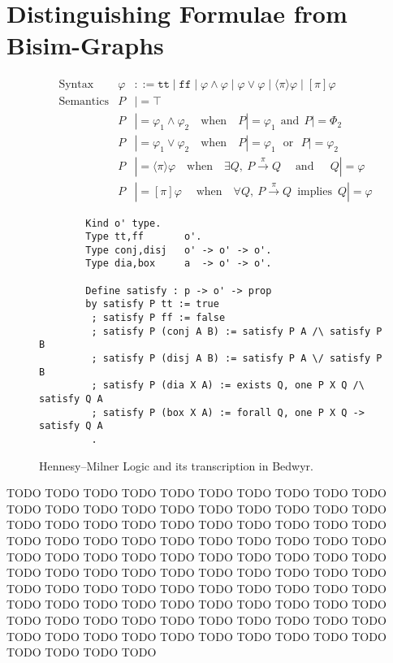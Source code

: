 \documentclass{llncs}
\begin{document}
\section{Distinguishing Formulae from Bisim-Graphs}\label{sec:ccsdf}

\begin{figure}
\begin{align*}
&\text{Syntax} &
\varphi & ::= \texttt{tt} \mid \texttt{ff}
    \mid \varphi \land \varphi \mid \varphi \lor \varphi
    \mid \langle\pi\rangle \varphi \mid [\pi] \varphi
\\
&\text{Semantics} &
  P & |= \top \\&&
  P & |= \varphi_1 \land \varphi_2 \quad\text{when}\quad P |= \varphi_1 ~~\text{and}~~ P |= \varPhi_2 \\&&
  P & |= \varphi_1 \lor \varphi_2 \quad\text{when}\quad P |= \varphi_1 ~~~\text{or}~~~ P |= \varphi_2 \\&&
  P & |= \langle \pi \rangle \varphi \quad\text{when}\quad \exists Q,~ P\xrightarrow{\pi} Q \;\quad\text{and}\quad\;\, Q |= \varphi \\&&
  P & |= [\pi] \varphi \;\quad\text{when}\quad \forall Q,~ P\xrightarrow{\pi} Q ~\;\text{implies}~\; Q |= \varphi
\end{align*}
\vspace*{-3ex}
\begin{lstlisting}
        Kind o' type.
        Type tt,ff       o'.
        Type conj,disj   o' -> o' -> o'.
        Type dia,box     a  -> o' -> o'. 

        Define satisfy : p -> o' -> prop
        by satisfy P tt := true
         ; satisfy P ff := false
         ; satisfy P (conj A B) := satisfy P A /\ satisfy P B
         ; satisfy P (disj A B) := satisfy P A \/ satisfy P B
         ; satisfy P (dia X A) := exists Q, one P X Q /\ satisfy Q A
         ; satisfy P (box X A) := forall Q, one P X Q -> satisfy Q A
         .
\end{lstlisting}
\vspace*{-2ex}
\caption{Hennesy--Milner Logic and its transcription in Bedwyr.}
  \label{TODO}
\end{figure}

TODO TODO TODO TODO TODO TODO TODO TODO TODO TODO TODO TODO TODO
TODO TODO TODO TODO TODO TODO TODO TODO TODO TODO TODO TODO TODO
TODO TODO TODO TODO TODO TODO TODO TODO TODO TODO TODO TODO TODO
TODO TODO TODO TODO TODO TODO TODO TODO TODO TODO TODO TODO TODO
TODO TODO TODO TODO TODO TODO TODO TODO TODO TODO TODO TODO TODO
TODO TODO TODO TODO TODO TODO TODO TODO TODO TODO TODO TODO TODO
TODO TODO TODO TODO TODO TODO TODO TODO TODO TODO TODO TODO TODO
TODO TODO TODO TODO TODO TODO TODO TODO TODO TODO TODO TODO TODO
\end{document}
